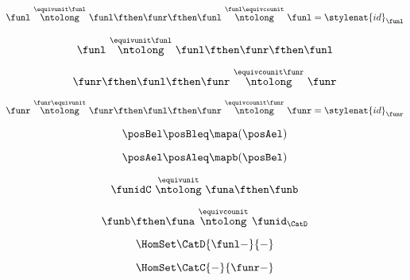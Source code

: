 \begin{forslides}
    \begin{equation}
        \label{eq:slides_adjunctions_53b}
        \funl \ \overset{\equivunit \funl }{\ntolong}\ \funl \fthen \funr  \fthen \funl \ \overset{\funl \equivcounit}{\ntolong}\ \funl = \stylenat{id}_\funl
    \end{equation}

    \begin{equation}
        \label{eq:slides_adjunctions_54}
        \funl \ \overset{\equivunit \funl }{\ntolong}\ \funl \fthen \funr \fthen \funl
    \end{equation}

    \begin{equation}
        \label{eq:slides_adjunctions_55}
        \funr \fthen \funl \fthen \funr  \ \overset{\equivcounit \funr}{\ntolong}\ \funr
    \end{equation}

    \begin{equation}
        \label{eq:slides_adjunctions_55b}
        \funr \ \overset{\funr\equivunit}{\ntolong}\ \funr \fthen \funl \fthen \funr  \ \overset{\equivcounit \funr}{\ntolong}\ \funr  =  \stylenat{id}_\funr
    \end{equation}

    \begin{equation}
        \label{eq:slides_adjunctions_56}
        \posBel \posBleq \mapa(\posAel)
    \end{equation}

    \begin{equation}
        \label{eq:slides_adjunctions_57}
        \posAel \posAleq \mapb(\posBel)
    \end{equation}

    \begin{equation}
        \label{eq:slides_adjunctions_58}
        \funidC \ \overset{\equivunit}{\ntolong}\ \funa \fthen \funb
    \end{equation}

    \begin{equation}
        \label{eq:slides_adjunctions_59}
        \funb \fthen \funa \ \overset{\equivcounit}{\ntolong}\ \funid_\CatD
    \end{equation}

    \begin{equation}
        \label{eq:slides_adjunctions_60}
        \HomSet\CatD{\funl -}{-}
    \end{equation}

    \begin{equation}
        \label{eq:slides_adjunctions_61}
        \HomSet\CatC{-}{\funr - }
    \end{equation}


\end{forslides}
